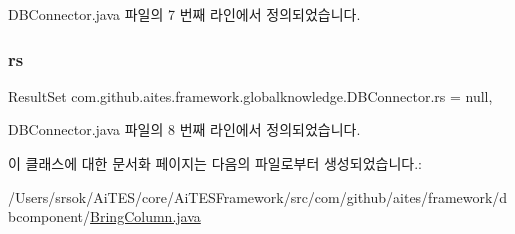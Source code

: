 D\+B\+Connector.\+java 파일의 7 번째 라인에서 정의되었습니다.

\mbox{\label{classcom_1_1github_1_1aites_1_1framework_1_1globalknowledge_1_1_d_b_connector_a36c87b41d86e8382bea688b2ca209764}} 
\subsubsection{\texorpdfstring{rs}{rs}}
{\footnotesize\ttfamily Result\+Set com.\+github.\+aites.\+framework.\+globalknowledge.\+D\+B\+Connector.\+rs = null\hspace{0.3cm}{\ttfamily [protected]}, {\ttfamily [inherited]}}



D\+B\+Connector.\+java 파일의 8 번째 라인에서 정의되었습니다.



이 클래스에 대한 문서화 페이지는 다음의 파일로부터 생성되었습니다.\+:\begin{DoxyCompactItemize}
\item 
/\+Users/srsok/\+Ai\+T\+E\+S/core/\+Ai\+T\+E\+S\+Framework/src/com/github/aites/framework/dbcomponent/\mbox{\hyperlink{_bring_column_8java}{Bring\+Column.\+java}}\end{DoxyCompactItemize}
